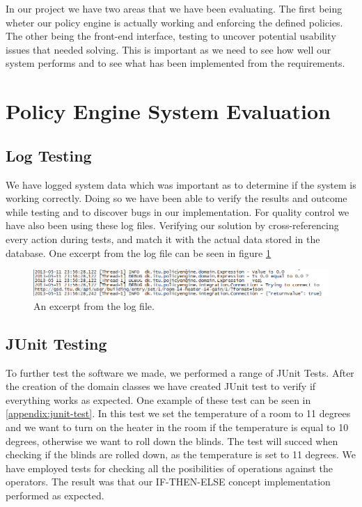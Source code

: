 In our project we have two areas that we have been evaluating. The first being wheter our policy engine is actually working and enforcing the defined policies. The other being the front-end interface, testing to uncover potential usability issues that needed solving.
This is important as we need to see how well our system performs and to see what has been implemented from the requirements.
\section{Policy Engine System Evaluation}
\label{policy-engine-system-evaluation}

\subsection{Log Testing}
\label{log-test}
We have logged system data which was important as to determine if the system is working correctly. Doing so we have been able to verify the results and outcome while testing and to discover bugs in our implementation.
For quality control we have also been using these log files. Verifying our solution by cross-referencing every action during tests, and match it with the actual data stored in the database.
One excerpt from the log file can be seen in figure \ref{fig:log}

\begin{figure}[ht]
\centering
\includegraphics[width=\columnwidth]{images/logoutput.png}
\caption{An excerpt from the log file.}
\label{fig:log}
\end{figure}

\subsection{JUnit Testing}
To further test the software we made, we performed a range of JUnit Tests. After the creation of the domain classes we have created JUnit test to verify if everything works as expected. 
One example of these test can be seen in \ref{appendix:junit-test}. In this test we set the temperature of a room to 11 degrees and we want to turn on the heater in the room if the temperature is equal to 10 degrees, otherwise we want to roll down the blinds. The test will succed when checking if the blinds are rolled down, as the temperature is set to 11 degrees. 
We have employed tests for checking all the posibilities of operations against the operators. 
The result was that our IF-THEN-ELSE concept implementation performed as expected. 

